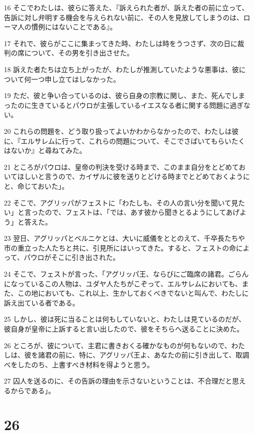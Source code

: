 \par 16 そこでわたしは、彼らに答えた、『訴えられた者が、訴えた者の前に立って、告訴に対し弁明する機会を与えられない前に、その人を見放してしまうのは、ローマ人の慣例にはないことである』。
\par 17 それで、彼らがここに集まってきた時、わたしは時をうつさず、次の日に裁判の席について、その男を引き出させた。
\par 18 訴えた者たちは立ち上がったが、わたしが推測していたような悪事は、彼について何一つ申し立てはしなかった。
\par 19 ただ、彼と争い合っているのは、彼ら自身の宗教に関し、また、死んでしまったのに生きているとパウロが主張しているイエスなる者に関する問題に過ぎない。
\par 20 これらの問題を、どう取り扱ってよいかわからなかったので、わたしは彼に、『エルサレムに行って、これらの問題について、そこでさばいてもらいたくはないか』と尋ねてみた。
\par 21 ところがパウロは、皇帝の判決を受ける時まで、このまま自分をとどめておいてほしいと言うので、カイザルに彼を送りとどける時までとどめておくようにと、命じておいた」。
\par 22 そこで、アグリッパがフェストに「わたしも、その人の言い分を聞いて見たい」と言ったので、フェストは、「では、あす彼から聞きとるようにしてあげよう」と答えた。
\par 23 翌日、アグリッパとベルニケとは、大いに威儀をととのえて、千卒長たちや市の重立った人たちと共に、引見所にはいってきた。すると、フェストの命によって、パウロがそこに引き出された。
\par 24 そこで、フェストが言った、「アグリッパ王、ならびにご臨席の諸君。ごらんになっているこの人物は、ユダヤ人たちがこぞって、エルサレムにおいても、また、この地においても、これ以上、生かしておくべきでないと叫んで、わたしに訴え出ている者である。
\par 25 しかし、彼は死に当ることは何もしていないと、わたしは見ているのだが、彼自身が皇帝に上訴すると言い出したので、彼をそちらへ送ることに決めた。
\par 26 ところが、彼について、主君に書きおくる確かなものが何もないので、わたしは、彼を諸君の前に、特に、アグリッパ王よ、あなたの前に引き出して、取調べをしたのち、上書すべき材料を得ようと思う。
\par 27 囚人を送るのに、その告訴の理由を示さないということは、不合理だと思えるからである」。

\chapter{26}

